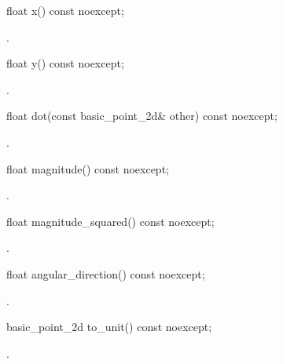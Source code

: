%
\begin{itemdecl}
float x() const noexcept;
\end{itemdecl}
\begin{itemdescr}
\pnum
\returns
{}.
\end{itemdescr}

%
\begin{itemdecl}
float y() const noexcept;
\end{itemdecl}
\begin{itemdescr}
\pnum
\returns
{}.
\end{itemdescr}

%
\begin{itemdecl}
float dot(const basic_point_2d& other) const noexcept;
\end{itemdecl}
\begin{itemdescr}
\pnum
\returns
{}.
\end{itemdescr}

%
\begin{itemdecl}
float magnitude() const noexcept;
\end{itemdecl}
\begin{itemdescr}
\pnum
\returns
{}.
\end{itemdescr}

%
\begin{itemdecl}
float magnitude_squared() const noexcept;
\end{itemdecl}
\begin{itemdescr}
\pnum
\returns
{}.
\end{itemdescr}

%
\begin{itemdecl}
float angular_direction() const noexcept;
\end{itemdecl}
\begin{itemdescr}
\pnum
\returns
{}.
\end{itemdescr}

%
\begin{itemdecl}
basic_point_2d to_unit() const noexcept;
\end{itemdecl}
\begin{itemdescr}
\pnum
\returns
{}.
\end{itemdescr}


